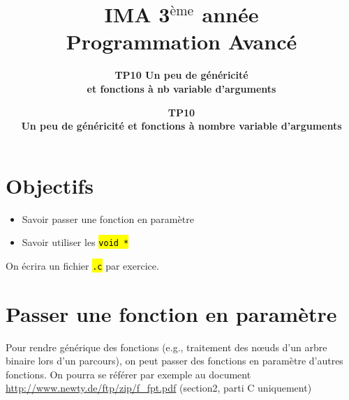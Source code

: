 \documentclass[final, pdftex, a4paper, openbib, ]{article}
\title{IMA 3$^{\mbox{\`eme}}$ année\\ Programmation Avancé
}
\author{\huge \textbf{TP10 Un peu de généricité}\\
		\huge \textbf{et fonctions à nb variable d'arguments}}
\author{\huge \textbf{TP10}\\
	\LARGE \textbf{Un peu de généricité et fonctions à nombre variable d'arguments}}
\date{}
\let\OldTexttt\texttt
\renewcommand{\texttt}[1]{\OldTexttt{\hl{#1}}}
\begin{document}
\posttitle{\par\end{center}}
\setlength{\droptitle}{-45pt}
\maketitle

\vspace{-1cm}
\section{Objectifs}

\begin{itemize}
	\item Savoir passer une fonction en paramètre
	\item Savoir utiliser les \texttt{void *}
\end{itemize}
On écrira un fichier \texttt{.c} par exercice.



\section{Passer une fonction en paramètre}

Pour rendre générique des fonctions (e.g., traitement des nœuds d'un arbre binaire lors d'un parcours), on peut passer des fonctions en paramètre d'autres fonctions.
On pourra se référer par exemple au document \url{http://www.newty.de/ftp/zip/f_fpt.pdf} (section2, parti C uniquement)
\end{document}

